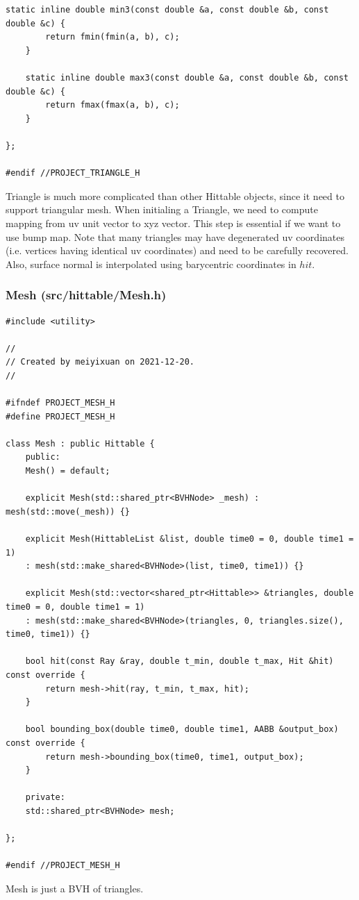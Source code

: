 \documentclass[utf8]{article}
\begin{document}
\begin{lstlisting}[style=CStyle]
	static inline double min3(const double &a, const double &b, const double &c) {
		return fmin(fmin(a, b), c);
	}
	
	static inline double max3(const double &a, const double &b, const double &c) {
		return fmax(fmax(a, b), c);
	}
	
};

#endif //PROJECT_TRIANGLE_H

\end{lstlisting}
Triangle is much more complicated than other Hittable objects, since it need to support triangular mesh. When initialing a Triangle, we need to compute mapping from uv unit vector to xyz vector. This step is essential if we want to use bump map. Note that many triangles may have degenerated uv coordinates (i.e. vertices having identical uv coordinates) and need to be carefully recovered. Also, surface normal is interpolated using barycentric coordinates in $hit$.

\subsubsection{Mesh (src/hittable/Mesh.h)}
\begin{lstlisting}[style=CStyle]
#include <utility>

//
// Created by meiyixuan on 2021-12-20.
//

#ifndef PROJECT_MESH_H
#define PROJECT_MESH_H

class Mesh : public Hittable {
	public:
	Mesh() = default;
	
	explicit Mesh(std::shared_ptr<BVHNode> _mesh) : mesh(std::move(_mesh)) {}
	
	explicit Mesh(HittableList &list, double time0 = 0, double time1 = 1)
	: mesh(std::make_shared<BVHNode>(list, time0, time1)) {}
	
	explicit Mesh(std::vector<shared_ptr<Hittable>> &triangles, double time0 = 0, double time1 = 1)
	: mesh(std::make_shared<BVHNode>(triangles, 0, triangles.size(), time0, time1)) {}
	
	bool hit(const Ray &ray, double t_min, double t_max, Hit &hit) const override {
		return mesh->hit(ray, t_min, t_max, hit);
	}
	
	bool bounding_box(double time0, double time1, AABB &output_box) const override {
		return mesh->bounding_box(time0, time1, output_box);
	}
	
	private:
	std::shared_ptr<BVHNode> mesh;
	
};

#endif //PROJECT_MESH_H

\end{lstlisting}
Mesh is just a BVH of triangles.
\end{document}
